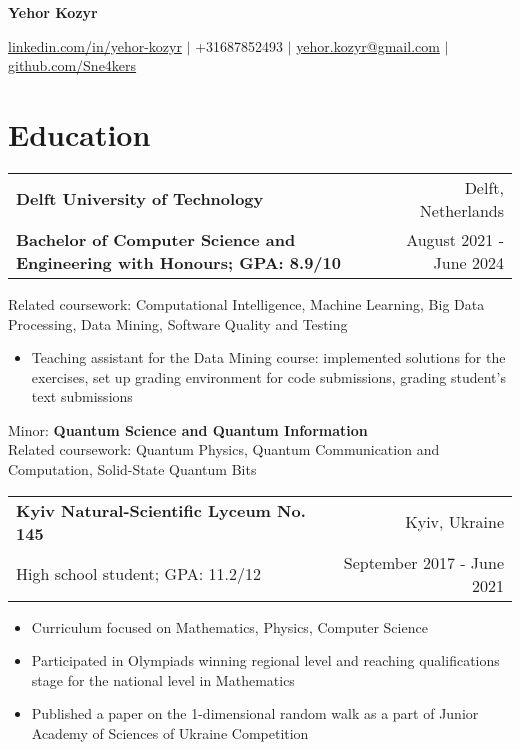 \documentclass[a4paper,21pt]{article}
\makeatletter
\newcommand{\nonBulletResumeSubheading}[4]{
  \vspace{-1pt}\normalsize{ \item[]
    \begin{tabular*}{0.97\textwidth}{l@{\extracolsep{\fill}}r}
      \textbf{#1} & #2 \\
      #3 & #4 \\
    \end{tabular*}}
    \vspace{-5pt}
}
\newcommand{\subItemOfItem}[1]{
    \item\small {#1}\vspace{-2pt}
}
\newcommand{\resumeSubHeadingListStart}{\begin{itemize}[leftmargin=*]}
\newcommand{\resumeSubHeadingListEnd}{\end{itemize}}
\newcommand{\resumeItemListStart}{\begin{itemize}}
\newcommand{\resumeItemListEnd}{\end{itemize}\vspace{-5pt}}
\makeatother
\begin{document}
\begin{center} \textbf{\LARGE{Yehor Kozyr}} \end{center}
\vspace{-12pt}
\begin{center}
\href{https://www.linkedin.com/in/yehor-kozyr/}{linkedin.com/in/yehor-kozyr} $\vert$ +31687852493 $\vert$ \href{mailto:yehor.kozyr@gmail.com}{yehor.kozyr@gmail.com} $\vert$ \href{https://github.com/Sne4kers}{github.com/Sne4kers} \end{center}


\section{Education}
  \resumeSubHeadingListStart
    \nonBulletResumeSubheading
      {Delft University of Technology}{Delft, Netherlands}
      {\textbf{Bachelor of Computer Science and Engineering with Honours;  GPA: 8.9/10}}{August 2021 - June 2024}
      \vspace{6pt}
      \scriptsize {\small{Related coursework: Computational Intelligence, Machine Learning, Big Data Processing, Data Mining, Software Quality and Testing}}\\
      \vspace{-3pt}
      \resumeItemListStart
      \subItemOfItem{\small{Teaching assistant for the Data Mining course: implemented solutions for the exercises, set up grading environment for code submissions, grading student's text submissions}}
      \resumeItemListEnd
      \scriptsize {\small{Minor: \textbf{Quantum Science and Quantum Information}}}\\
      \scriptsize {\small{Related coursework: Quantum Physics, Quantum Communication and Computation, Solid-State Quantum Bits}}
  \nonBulletResumeSubheading  
      {Kyiv Natural-Scientific Lyceum No. 145}{Kyiv, Ukraine}
      {High school student; GPA: 11.2/12}{September 2017 - June 2021}
      \resumeItemListStart
          \subItemOfItem{Curriculum focused on Mathematics, Physics, Computer Science}
          \subItemOfItem{Participated in Olympiads winning regional level and reaching qualifications stage for the national level in Mathematics}
          \subItemOfItem{Published a paper on the 1-dimensional random walk as a part of Junior Academy of Sciences of Ukraine Competition }
      \resumeItemListEnd
\resumeSubHeadingListEnd
\end{document}
